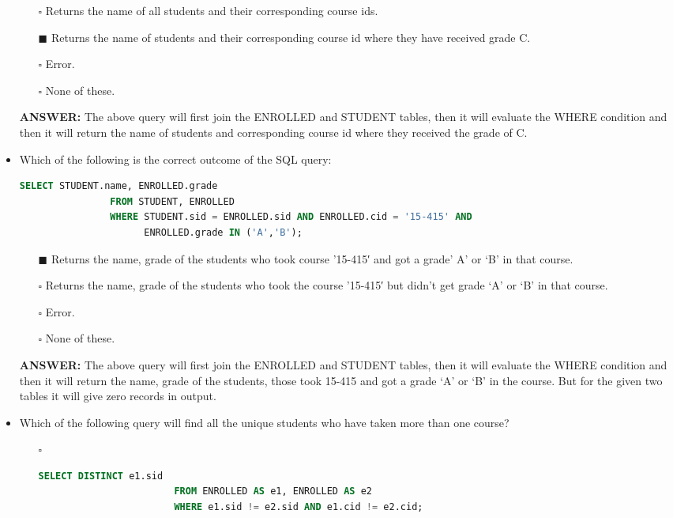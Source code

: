 \documentclass[10pt]{article}
\begin{document}
\begin{itemize}
			\begin{enumerate}
				\item[$\square$] Returns the name of all students and their corresponding course ids.
				\item[$\blacksquare$] Returns the name of students and their corresponding course id where they have received grade C.
				\item[$\square$] Error.
				\item[$\square$] None of these.
			\end{enumerate}
			\color{red} \textbf{ANSWER:} \color{black} The above query will first join the ENROLLED and STUDENT tables, then it will evaluate the WHERE condition and then it will return the name of students and corresponding course id where they received the grade of C.

		\item Which of the following is the correct outcome of the SQL query: 
			\begin{lstlisting}[language=SQL,firstline=1, lastline=4]
				SELECT STUDENT.name, ENROLLED.grade 
				FROM STUDENT, ENROLLED 
				WHERE STUDENT.sid = ENROLLED.sid AND ENROLLED.cid = '15-415' AND 
				      ENROLLED.grade IN ('A','B');
			\end{lstlisting}

			\begin{enumerate}
				\item[$\blacksquare$] Returns the name, grade of the students who took course ’15-415′ and got a grade’ A’ or ‘B’ in that course.
				\item[$\square$] Returns the name, grade of the students who took the course ’15-415′ but didn’t get grade ‘A’ or ‘B’ in that course.
				\item[$\square$] Error.
				\item[$\square$] None of these.
			\end{enumerate}
			\color{red} \textbf{ANSWER:} \color{black} The above query will first join the ENROLLED and STUDENT tables, then it will evaluate the WHERE condition and then it will return the name, grade of the students, those took 15-415 and got a grade ‘A’ or ‘B’ in the course.  But for the given two tables it will give zero records in output.

		\item Which of the following query will find all the unique students who have taken more than one course?
			\begin{enumerate}
				\item[$\square$] 
					\begin{lstlisting}[language=SQL,firstline=1, lastline=3, numbers = right] 
						SELECT DISTINCT e1.sid 
						FROM ENROLLED AS e1, ENROLLED AS e2 
						WHERE e1.sid != e2.sid AND e1.cid != e2.cid;
					\end{lstlisting}


\end{enumerate}
\end{itemize}
\end{document}
